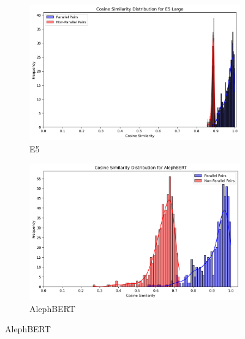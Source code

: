 \documentclass[12pt]{article}
\begin{document}
\begin{figure}[htbp]
\centering

\begin{subfigure}{0.45\textwidth}
    \centering
    \includegraphics[width=\linewidth]{nonpar_par_histogram_E5Large.png}
    \caption{E5}
    \label{fig:e5_dist}
\end{subfigure}
\hfill
\begin{subfigure}{0.45\textwidth}
    \centering
    \includegraphics[width=\linewidth]{nonpar_par_histogram_AlephBERT.png}
    \caption{AlephBERT}
    \label{fig:alephbert_dist}
\end{subfigure}

\vspace{1em}


\end{figure}
\end{document}
